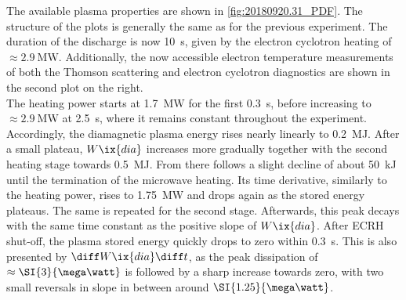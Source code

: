 %
            The available plasma properties are shown in \cref{fig:20180920.31_PDF}. The structure of the plots is generally the same as for the previous experiment. The duration of the discharge is now \SI{10}{\second}, given by the electron cyclotron heating of $\approx\SI{2.9}{\mega\watt}$. Additionally, the now accessible electron temperature measurements of both the Thomson scattering and electron cyclotron diagnostics are shown in the second plot on the right.\\%
            The heating power starts at \SI{1.7}{\mega\watt} for the first \SI{0.3}{\second}, before increasing to $\approx\SI{2.9}{\mega\watt}$ at \SI{2.5}{\second}, where it remains constant throughout the  experiment. Accordingly, the diamagnetic plasma energy rises nearly linearly to \SI{0.2}{\mega\joule}. After a small plateau, $W\ix{dia}$ increases more gradually together with the second heating stage towards \SI{0.5}{\mega\joule}. From there follows a slight decline of about \SI{50}{\kilo\joule} until the termination of the microwave heating. Its time derivative, similarly to the heating power, rises to \SI{1.75}{\mega\watt} and drops again as the stored energy plateaus. The same is repeated for the second stage. Afterwards, this peak decays with the same time constant as the positive slope of $W\ix{dia}$. After ECRH shut-off, the plasma stored energy quickly drops to zero within \SI{0.3}{\second}. This is also presented by $\diff W\ix{dia}\diff t$, as the peak dissipation of $\approx\-\SI{3}{\mega\watt}$ is followed by a sharp increase towards zero, with two small reversals in slope in between around $\-\SI{1.25}{\mega\watt}$.\\%
